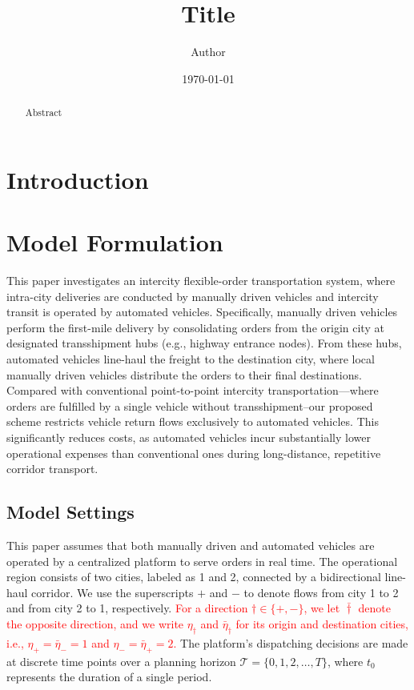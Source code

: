 \documentclass[10pt, reqno]{amsart}
\begin{document}
\title{Title} %
\author[Initial Surname]{Author}
\date{\today}
\address{Address}
\maketitle

\let\thefootnote\relax
{} %

\begin{abstract}
Abstract
\end{abstract} %

\bigskip
\section{Introduction}

\section{Model Formulation}
This paper investigates an intercity flexible-order transportation system, where intra-city deliveries are conducted by manually driven vehicles and intercity transit is operated by automated vehicles. Specifically, manually driven vehicles perform the first-mile delivery by consolidating orders from the origin city at designated transshipment hubs (e.g., highway entrance nodes). From these hubs, automated vehicles line-haul the freight to the destination city, where local manually driven vehicles distribute the orders to their final destinations. Compared with conventional point-to-point intercity transportation—where orders are fulfilled by a single vehicle without transshipment--our proposed scheme restricts vehicle return flows exclusively to automated vehicles. This significantly reduces costs, as automated vehicles incur substantially lower operational expenses than conventional ones during long-distance, repetitive corridor transport.

\subsection{Model Settings} \label{subsec:settings}

This paper assumes that both manually driven and automated vehicles are operated by a centralized platform to serve orders in real time. The operational region consists of two cities, labeled as 1 and 2, connected by a bidirectional line-haul corridor. We use the superscripts $+$ and $-$ to denote flows from city 1 to 2 and from city 2 to 1, respectively. \textcolor{red}{For a direction $\dagger\in\{+,-\}$, we let $\bar{\dagger}$ denote the opposite direction, and we write $\eta_{\dagger}$ and $\bar{\eta}_{\dagger}$ for its origin and destination cities, i.e., $\eta_{+}=\bar{\eta}_{-}=1$ and $\eta_{-}=\bar{\eta}_{+}=2$.} The platform's dispatching decisions are made at discrete time points over a planning horizon $\mathcal{T} = \{0, 1, 2, \dots, T\}$, where $t_0$ represents the duration of a single period.
\end{document}
